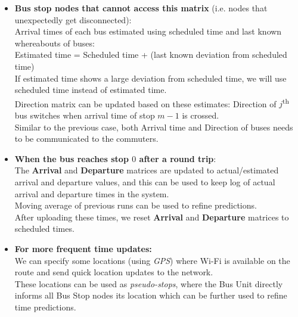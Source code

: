 \begin{itemize}
\item \textbf{Bus stop nodes that cannot access this matrix} (i.e. nodes that unexpectedly get disconnected):\\
\null \qquad Arrival times of each bus estimated using scheduled time and last known whereabouts of buses:\\
\null \qquad \qquad Estimated time = Scheduled time + (last known deviation from scheduled\\
\null \qquad \qquad time)\\
\null \qquad If estimated time shows a large deviation from scheduled time, we will use scheduled time instead of estimated time.\\
\null \qquad Direction matrix can be updated based on these estimates: Direction of $j$\textsuperscript{th} bus switches when arrival time of stop $m-1$ is crossed.\\
\null \qquad Similar to the previous case, both Arrival time and Direction of buses needs to be communicated to the commuters.

\item \textbf{When the bus reaches stop $0$ after a round trip}:\\
\null \qquad The \textbf{Arrival} and \textbf{Departure} matrices are updated to actual/estimated arrival and departure values, and this can be used to keep log of actual arrival and departure times in the system.\\
\null \qquad Moving average of previous runs can be used to refine predictions.\\
\null \qquad After uploading these times, we reset \textbf{Arrival} and \textbf{Departure} matrices to scheduled times.

\item \textbf{For more frequent time updates:}\\
\null \qquad We can specify some locations (using \textit{GPS}) where Wi-Fi is available on the route and send quick location updates to the network.\\
\null \qquad These locations can be used as \textit{pseudo-stops}, where the Bus Unit directly informs all Bus Stop nodes its location which can be further used to refine time predictions.
\end{itemize}